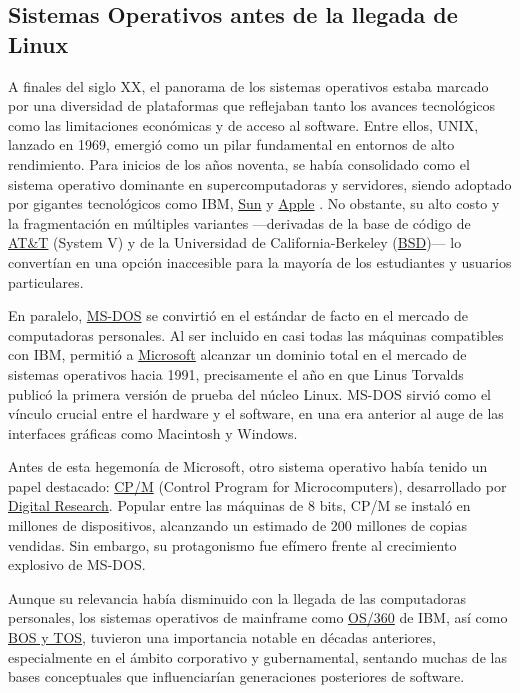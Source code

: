 \documentclass[a4paper,12pt]{article}
\begin{document}
\subsection{Sistemas Operativos antes de la llegada de Linux}
A finales del siglo XX, el panorama de los sistemas operativos estaba marcado
por una diversidad de plataformas que reflejaban tanto los avances tecnológicos
como las limitaciones económicas y de acceso al software. Entre ellos,
UNIX, lanzado en 1969, emergió como un pilar fundamental en
entornos de alto rendimiento. Para inicios de los años noventa, se había
consolidado como el sistema operativo dominante en supercomputadoras y
servidores, siendo adoptado por gigantes tecnológicos como \hypertarget{ibm}{IBM},
\hyperlink{sun}{Sun} y \hyperlink{apple}{Apple} .  No obstante, su alto costo y la
fragmentación en múltiples variantes —derivadas de la base de código de
\hyperlink{att}{AT\&T} (System V) y de la Universidad de California-Berkeley
(\hyperlink{bsd}{BSD})— lo convertían en una opción inaccesible para la mayoría
de los estudiantes y usuarios particulares.

En paralelo, \hyperlink{msdos}{MS-DOS} se convirtió en el estándar de facto en el
mercado de computadoras personales. Al ser incluido en casi todas las máquinas
compatibles con IBM, permitió a \hyperlink{microsoft}{Microsoft}
alcanzar un dominio total en el mercado de sistemas operativos hacia 1991,
precisamente el año en que Linus Torvalds publicó la primera versión de prueba
del núcleo Linux. MS-DOS sirvió como el vínculo crucial entre
el hardware y el software, en una era anterior al auge de las interfaces
gráficas como Macintosh y Windows.

Antes de esta hegemonía de Microsoft, otro sistema operativo había tenido un
papel destacado: \hyperlink{cpm}{CP/M} (Control Program for Microcomputers),
desarrollado por \hyperlink{digitalresearch}{Digital Research}. Popular entre las
máquinas de 8 bits, CP/M se instaló en millones de dispositivos,
alcanzando un estimado de 200 millones de copias vendidas. Sin embargo, su
protagonismo fue efímero frente al crecimiento explosivo de
MS-DOS.

Aunque su relevancia había disminuido con la llegada de las computadoras
personales, los sistemas operativos de mainframe como \hyperlink{os360}{OS/360}
de IBM, así como \hyperlink{bostos}{BOS y TOS}, tuvieron una
importancia notable en décadas anteriores, especialmente en el ámbito
corporativo y gubernamental, sentando muchas de las bases conceptuales que
influenciarían generaciones posteriores de software.
\end{document}
